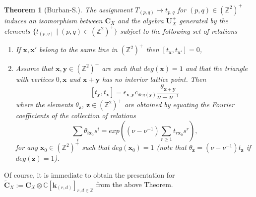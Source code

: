 \documentclass[a4paper,10pt]{amsart}
\def\Z{\mathbb{Z}}
\def\U{\mathbf{U}}
\def\C{\mathbb{C}}
\def\CC{\mathbf{C}}
\def\x{\mathbf{x}}
\def\y{\mathbf{y}}
\def\z{\mathbf{z}}
\newtheorem{theo}{\bf{Theorem}}[section]
\numberwithin{equation}{section}
\begin{document}
{\vspace{.1in}

\begin{theo}[Burban-S.]\label{T:BS}  The assignment $T_{(p,q)} \mapsto {t}_{p,q}$ for $(p,q) \in (\Z^2)^+$ induces an isomorphism between $\CC_X$ and the algebra $\U^+_X$ generated by the elements $\{{t}_{(p,q)}\;|\; (p,q) \in (\Z^2)^+\}$ subject to the following set of relations
\begin{enumerate}
\item[i)] If $\x,\x'$ belong to the same line in $(\Z^2)^+$ then
$[{t}_\x,{t}_{\x'}]=0$,
\item[ii)] Assume that $\x,\y \in (\Z^2)^+$ are such that $deg(\x)=1$ and that
the triangle with vertices $0, \x$ and $\x+\y$ has no interior lattice point. Then
\begin{equation}\label{E:eqq1}
[t_\y,t_{\x}]=\epsilon_{\x,\y}c_{deg(\y)}\frac{\theta_{\x+\y}}{\nu-\nu^{-1}}
\end{equation}
where the elements $\theta_{\z}$, $\z \in (\Z^2)^+$ are obtained by equating the Fourier
 coefficients of the collection of relations
\begin{equation}\label{E:eqq2}
\sum_i \theta_{i\x_0}s^i=exp((\nu-\nu^{-1})\sum_{r \geq 1}t_{r\x_0}s^r),
\end{equation}
for any $\x_0 \in (\Z^2)^+$ such that $deg(\x_0)=1$ (note that $\theta_{\z}=(\nu-\nu^{-1})t_{\z}$ if $deg(\z)=1$).
\end{enumerate}
\end{theo}

\vspace{.1in}

Of course, it is immediate to obtain the presentation for $\widetilde{\CC}_X:=\CC_X \otimes \C[\mathbf{k}_{(r,d)}]_{r,d \in \Z}$ from the above Theorem.

\vspace{.2in}

\addtocounter{theo}{1}
}
\end{document}
